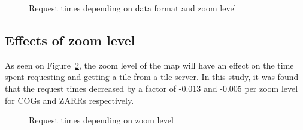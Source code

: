 \documentclass[
  oneside,
  open=any]{scrbook}
\begin{document}
\begin{figure}[H]


\caption{\label{fig-format-comp}Request times depending on data format
and zoom level}

\end{figure}%

\subsection{Effects of zoom level}\label{effects-of-zoom-level}

As seen on Figure~\ref{fig-comp-zoom}, the zoom level of the map will
have an effect on the time spent requesting and getting a tile from a
tile server. In this study, it was found that the request times
decreased by a factor of -0.013 and -0.005 per zoom level for COGs and
ZARRs respectively.

\begin{figure}[H]


\caption{\label{fig-comp-zoom}Request times depending on zoom level}

\end{figure}%
\end{document}
